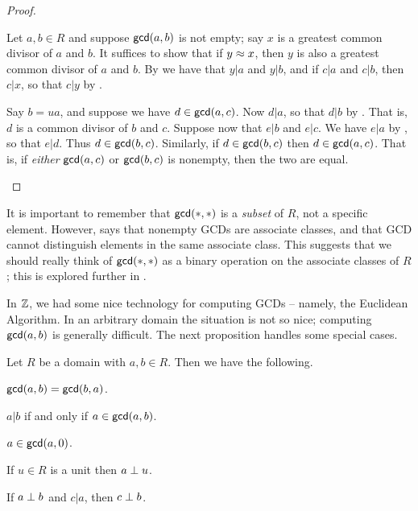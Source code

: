 \begin{proof}
\begin{inlineproplist}
\item Let \(a,b \in R\) and suppose \(\mathsf{gcd}(a, b)\) is not empty; say \(x\) is a greatest common divisor of \(a\) and \(b\).
It suffices to show that if \(y \approx x\), then \(y\) is also a greatest common divisor of \(a\) and \(b\).
By  we have that \(y|a\) and \(y|b\), and if \(c|a\) and \(c|b\), then \(c|x\), so that \(c|y\) by .
\item Say \(b = ua\), and suppose we have \(d \in \mathsf{gcd}(a, c)\).
Now \(d|a\), so that \(d|b\) by .
That is, \(d\) is a common divisor of \(b\) and \(c\).
Suppose now that \(e|b\) and \(e|c\).
We have \(e|a\) by , so that \(e|d\).
Thus \(d \in \mathsf{gcd}(b, c)\).
Similarly, if \(d \in \mathsf{gcd}(b, c)\) then \(d \in \mathsf{gcd}(a, c)\).
That is, if \emph{either} \(\mathsf{gcd}(a, c)\) or \(\mathsf{gcd}(b, c)\) is nonempty, then the two are equal.
\end{inlineproplist}
\end{proof}

It is important to remember that \(\mathsf{gcd}(\ast, \ast)\) is a \emph{subset} of \(R\), not a specific element.
However,  says that nonempty GCDs are associate classes, and that GCD cannot distinguish elements in the same associate class.
This suggests that we should really think of \(\mathsf{gcd}(\ast, \ast)\) as a binary operation on the associate classes of \(R\); this is explored further in .

In \(\mathbb{Z}\), we had some nice technology for computing GCDs -- namely, the Euclidean Algorithm.
In an arbitrary domain the situation is not so nice; computing \(\mathsf{gcd}(a, b)\) is generally difficult.
The next proposition handles some special cases.

\begin{prop} \label{prop:gcd-basics}
Let \(R\) be a domain with \(a,b \in R\).
Then we have the following.
\begin{proplist*}
\item \(\mathsf{gcd}(a, b) = \mathsf{gcd}(b, a)\).
\item \(a|b\) if and only if \(a \in \mathsf{gcd}(a, b)\).
\item \(a \in \mathsf{gcd}(a, 0)\).
\item If \(u \in R\) is a unit then \(a \perp u\).
\item \label{prop:gcd-basics:coprime-factor} If \(a \perp b\) and \(c|a\), then \(c \perp b\).
\end{proplist*}
\end{prop}

